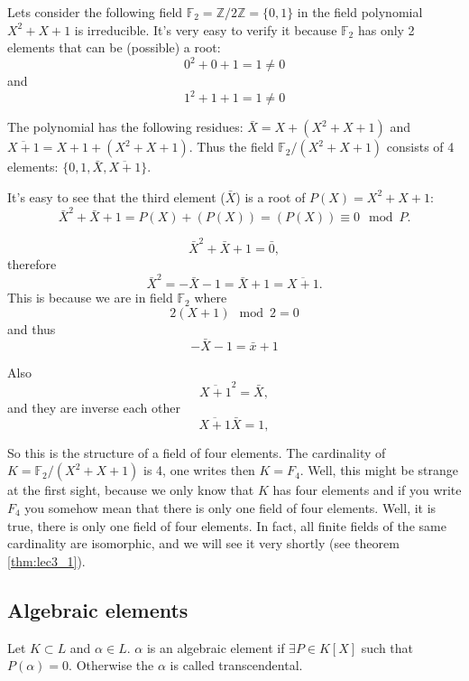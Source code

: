 \begin{example}[$K = \mathbb{F}_2/\left(X^2+X+1\right)$]
  Lets consider the following field
  $\mathbb{F}_2 = \mathbb{Z}/2\mathbb{Z} = \{0,1\}$ in the
  field polynomial $X^2+X+1$ is irreducible. It's very easy to verify
  it because $\mathbb{F}_2$ has only 2 elements that can be (possible)
  a root:
  \[
  0^2+0+1 = 1\ne 0
  \]
  and
  \[
  1^2+1+1 = 1\ne 0
  \]
  
  The polynomial has the following
  residues: $\bar{X} = X + \left(X^2+X+1\right)$ and
  $\overline{X + 1} = X + 1 + \left(X^2+X+1\right)$. Thus the field
  $\mathbb{F}_2/\left(X^2+X+1\right)$ consists of 4 elements:
  $\{0, 1, \bar{X}, \overline{X+1}\}$.

  It's easy to see that the third element ($\bar{X}$) is a root of
  $P(X) = X^2+X+1$:
  \[
  \bar{X}^2 + \bar{X} + 1 =
  P(X) + \left(P(X)\right) = \left(P(X)\right) \equiv 0 \mod P.
  \]
  
  \[
  \bar{X}^2 + \bar{X} + 1 = \bar{0},
  \]
  therefore 
  \[
  \bar{X}^2 = - \bar{X} - 1 = \bar{X} + 1 = \overline{X+1}.
  \]
  This is because we are in field $\mathbb{F}_2$ where
  \[
  2 \left(X + 1\right) \mod 2 = 0 
  \]
  and thus
  \[
  - \bar{X} - 1 = \bar{x} + 1
  \]
  
  Also
  \[
  \overline{X+1}^2 = \bar{X},
  \]
  and they are inverse each other
  \[
  \overline{X+1} \bar{X} = 1,
  \]

  So this is the structure of a field of four elements.  The
  cardinality of $K=\mathbb{F}_2/\left(X^2+X+1\right)$ is 4,  one
  writes then $K=F_4$. Well, this might be 
  strange at the first sight, because we only know that $K$ has four
  elements and if you write $F_4$  you somehow mean that there is only
  one field of four elements. Well, it is true, there is only one
  field of four elements. In fact, all finite fields of the same
  cardinality are isomorphic, and we will see it very shortly
  (see theorem \ref{thm:lec3_1}).  
  \label{ex:F2overP}
\end{example}

\subsection{Algebraic elements}

\begin{definition}
  Let $K \subset L$ and $\alpha \in L$. $\alpha$ is an algebraic
  element if $\exists P \in K\left[X\right]$ such that
    $P\left(\alpha\right) = 0$. Otherwise the $\alpha$ is called
    transcendental.
  \label{def:algebraicelement}
\end{definition}

